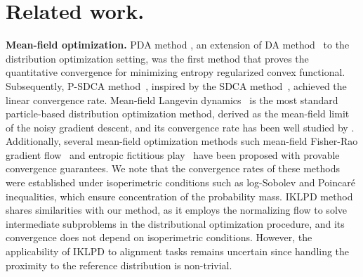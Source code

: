 \section{Related work.}
\vspace{-1mm}
\textbf{Mean-field optimization.}\quad
PDA method \citep{NEURIPS2021_a34e1ddb,nishikawa2022twolayer}, an extension of DA method~\citep{Nesterov2009} to the distribution optimization setting, was the first method that proves the quantitative convergence for minimizing entropy regularized convex functional. Subsequently, P-SDCA method~\citep{oko2022particle}, inspired by the SDCA method~\citep{shalev2013stochastic}, achieved the linear convergence rate. Mean-field Langevin dynamics~\citep{mei2018mf} is the most standard particle-based distribution optimization method, derived as the mean-field limit of the noisy gradient descent, and its convergence rate has been well studied by \cite{mei2018mf,hu2021mean,nitanda22mfld,chizat2022meanfield,suzuki2023mfld,nitanda2024improved}. Additionally, several mean-field optimization methods such mean-field Fisher-Rao gradient flow~\citep{liu2023polyak} and entropic fictitious play~\citep{chen2023entropic,pmlr-v202-nitanda23a} have been proposed with provable convergence guarantees. We note that the convergence rates of these methods were established under isoperimetric conditions such as log-Sobolev and Poincar\'e inequalities, which ensure concentration of the probability mass.
IKLPD method \citep{pmlr-v238-yao24a} shares similarities with our method, as it employs the normalizing flow to solve intermediate subproblems in the distributional optimization procedure, and its convergence does not depend on isoperimetric conditions. However, the applicability of IKLPD to alignment tasks remains uncertain since handling the proximity to the reference distribution is non-trivial.



